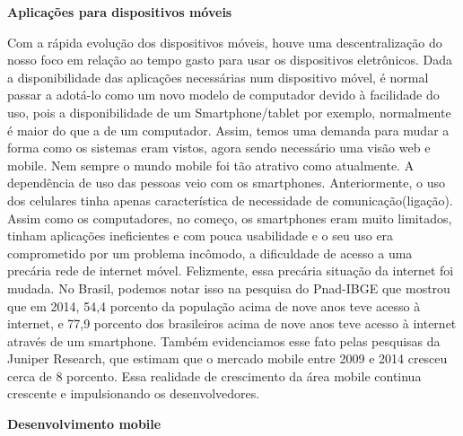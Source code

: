 \textbf{Aplicações para dispositivos móveis}

Com a rápida evolução dos dispositivos móveis, houve uma descentralização do nosso foco em relação ao tempo gasto para usar os dispositivos eletrônicos.
Dada a disponibilidade das aplicações necessárias num dispositivo móvel, é normal passar a adotá-lo como um novo modelo de computador devido à facilidade do uso, pois a disponibilidade de um Smartphone/tablet por exemplo, normalmente é maior do que a de um computador. Assim, temos uma demanda para mudar a forma como os sistemas eram vistos, agora sendo necessário uma visão web e mobile.
Nem sempre o mundo mobile foi tão atrativo como atualmente. A dependência de uso das pessoas veio com os smartphones. Anteriormente, o uso dos celulares tinha apenas característica de necessidade de comunicação(ligação). Assim como os computadores, no começo, os smartphones eram muito limitados, tinham aplicações ineficientes e com pouca usabilidade e o seu uso era comprometido por um problema incômodo, a dificuldade de acesso a uma precária rede de internet móvel.
Felizmente, essa precária situação da internet foi mudada. No Brasil, podemos notar isso na pesquisa do Pnad-IBGE que mostrou que em 2014, 54,4 porcento da população acima de nove anos teve acesso à internet, e 77,9 porcento dos brasileiros acima de nove anos teve acesso à internet através de um smartphone. Também evidenciamos esse fato pelas pesquisas da Juniper Research, que estimam que o mercado mobile entre 2009 e 2014 cresceu cerca de 8 porcento. Essa realidade de crescimento da área mobile continua crescente e impulsionando os desenvolvedores. 

\textbf{Desenvolvimento mobile}

